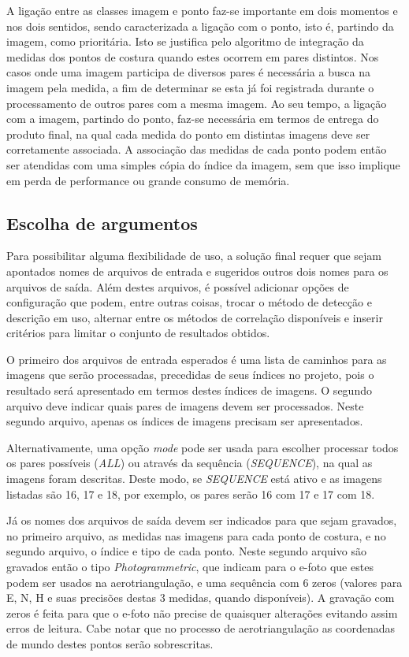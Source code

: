 A ligação entre as classes imagem e ponto faz-se importante em dois momentos e nos dois sentidos, sendo caracterizada a ligação com o ponto, isto é, partindo da imagem, como prioritária. Isto se justifica pelo algoritmo de integração da medidas dos pontos de costura quando estes ocorrem em pares distintos. Nos casos onde uma imagem participa de diversos pares é necessária a busca na imagem pela medida, a fim de determinar se esta já foi registrada durante o processamento de outros pares com a mesma imagem. Ao seu tempo, a ligação com a imagem, partindo do ponto, faz-se necessária em termos de entrega do produto final, na qual cada medida do ponto em distintas imagens deve ser corretamente associada. A associação das medidas de cada ponto podem então ser atendidas com uma simples cópia do índice da imagem, sem que isso implique em perda de performance ou grande consumo de memória.



\subsection{Escolha de argumentos}

Para possibilitar alguma flexibilidade de uso, a solução final requer que sejam apontados nomes de arquivos de entrada e sugeridos outros dois nomes para os arquivos de saída. Além destes arquivos, é possível adicionar opções de configuração que podem, entre outras coisas, trocar o método de detecção e descrição em uso, alternar entre os métodos de correlação disponíveis e inserir critérios para limitar o conjunto de resultados obtidos.

O primeiro dos arquivos de entrada esperados é uma lista de caminhos para as imagens que serão processadas, precedidas de seus índices no projeto, pois o resultado será apresentado em termos destes índices de imagens. O segundo arquivo deve indicar quais pares de imagens devem ser processados. Neste segundo arquivo, apenas os índices de imagens precisam ser apresentados.

Alternativamente, uma opção \textit{mode} pode ser usada para escolher processar todos os pares possíveis (\textit{ALL}) ou através da sequência (\textit{SEQUENCE}), na qual as imagens foram descritas. Deste modo, se \textit{SEQUENCE} está ativo e as imagens listadas são 16, 17 e 18, por exemplo, os pares serão 16 com 17 e 17 com 18.

Já os nomes dos arquivos de saída devem ser indicados para que sejam gravados, no primeiro arquivo, as medidas nas imagens para cada ponto de costura, e no segundo arquivo, o índice e tipo de cada ponto. Neste segundo arquivo são gravados então o tipo \textit{Photogrammetric}, que indicam para o e-foto que estes podem ser usados na aerotriangulação, e uma sequência com 6 zeros (valores para E, N, H e suas precisões destas 3 medidas, quando disponíveis). A gravação com zeros é feita para que o e-foto não precise de quaisquer alterações evitando assim erros de leitura. Cabe notar que no processo de aerotriangulação as coordenadas de mundo destes pontos serão sobrescritas.

